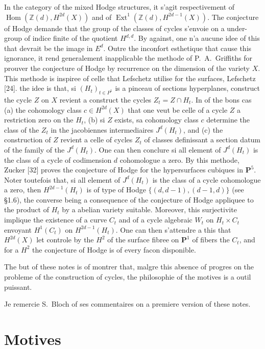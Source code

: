 \documentclass[11pt,a4paper]{article}
\theoremstyle{plain}
\theoremstyle{definition}
\DeclareMathOperator{\Ext}{Ext}
\DeclareMathOperator{\Hom}{Hom}
\newcommand{\Z}{\mathbb{Z}}
\begin{document}
In the category of the mixed Hodge structures, it s'agit respectivement of
$\Hom(\Z(d), H^{2d}(X))$ and of $\Ext^1(\Z(d), H^{2d-1}(X))$. The conjecture of Hodge demande that the group of the classes of cycles s'envoie on a under-group of indice finite of the quotient $H^{d,d}$. By against, one n'a aucune idee of this that devrait be the image in $E^d$. Outre the inconfort esthetique that cause this ignorance, it rend generalement inapplicable the methode of P.~A.~Griffiths for prouver the conjecture of Hodge by recurrence on the dimension of the variety $X$. This methode is inspiree of celle that Lefschetz utilise for the surfaces, Lefschetz [24]. the idee is that, si $(H_t)_{t \in P^1}$ is a pinceau of sections hyperplanes, construct the cycle $Z$ on $X$ revient a construct the cycles $Z_t = Z \cap H_t$. In of the bons cas (a) the cohomology class $c \in H^{2d}(X)$ that one veut be celle of a cycle $Z$ a restriction zero on the $H_t$, (b) si $Z$ exists, sa cohomology class $c$ determine the class of the $Z_t$ in the jacobiennes intermediaires $J^d(H_t)$, and (c) the construction of $Z$ revient a celle of cycles $Z_t$ of classes definissant a section datum of the family of the $J^d(H_t)$. One can then conclure si all element of $J^d(H_t)$ is the class of a cycle of codimension $d$ cohomologue a zero. By this methode, Zucker [32] proves the conjecture of Hodge for the hypersurfaces cubiques in $\mathbf{P}^5$. Noter toutefois that, si all element of $J^d(H_t)$ is the class of a cycle cohomologue a zero, then $H^{2d-1}(H_t)$ is of type of Hodge $\{(d, d-1), (d-1, d)\}$ (see \S1.6), the converse being a consequence of the conjecture of Hodge appliquee to the product of $H_t$ by a abelian variety suitable. Moreover, this surjectivite implique the existence of a curve $C_t$ and of a cycle algebraic $W_t$ on $H_t \times C_t$ envoyant $H^1(C_t)$ on $H^{2d-1}(H_t)$. One can then s'attendre a this that $H^{2d}(X)$ let controle by the $H^2$ of the surface fibree on $\mathbf{P}^1$ of fibers the $C_t$, and for a $H^2$ the conjecture of Hodge is of every facon disponible.

\vspace{0.5em}

The but of these notes is of montrer that, malgre this absence of progres on the probleme of the construction of cycles, the philosophie of the motives is a outil puissant.

Je remercie S.~Bloch of ses commentaires on a premiere version of these notes.


\section{Motives}
\end{document}
